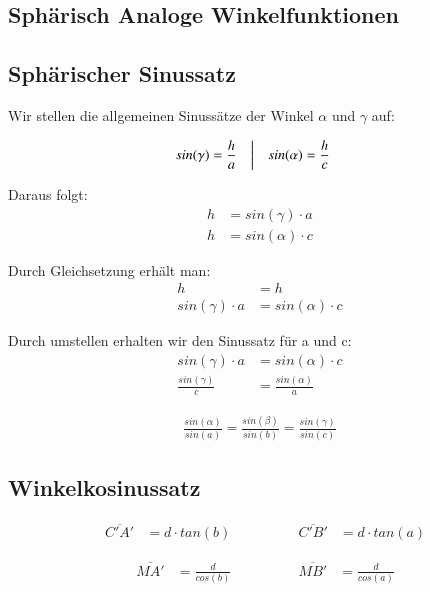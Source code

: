 \begin{refsection}
\section{Sphärisch Analoge Winkelfunktionen}

\subsection{Sphärischer Sinussatz}

Wir stellen die allgemeinen Sinussätze der Winkel $\alpha$ und $\gamma$ auf:


\[
\begin{aligned}
&{sin(\gamma)} = \frac{h}{a}
&
&\text{\bigg \vert}
&
&{sin(\alpha)} = \frac{h}{c}
&
\end{aligned}
\]

Daraus folgt:
\begin{align*}
h &= sin(\gamma)\cdot a \\
h &= sin(\alpha)\cdot c
\end{align*} 

Durch Gleichsetzung erhält man:
\begin{align*}
h &= h \\
sin(\gamma)\cdot a &= sin(\alpha)\cdot c
\end{align*} 

Durch umstellen erhalten wir den Sinussatz für a und c:
\begin{align*}
sin(\gamma)\cdot a &= sin(\alpha)\cdot c \\
\frac{sin(\gamma)}{c} &= \frac{sin(\alpha)}{a} 
\end{align*} 



\begin{align*}
\frac{sin(\alpha)}{sin(a)} = \frac{sin(\beta)}{sin(b)} = \frac{sin(\gamma)}{sin(c)}
\end{align*} 


\subsection{Winkelkosinussatz}


\[
\begin{aligned}
&\overline{C'A'} &= d\cdot {tan(b)}
&
&
&
&
&
&\overline{C'B'} &= d\cdot {tan(a)}
\end{aligned}
\]

\[
\begin{aligned}
&\overline{MA'} &= \frac{ d }{cos(b)}
&
&
&
&
&
&\overline{MB'} &= \frac{ d }{cos(a)}
\end{aligned}
\]


\end{refsection}
